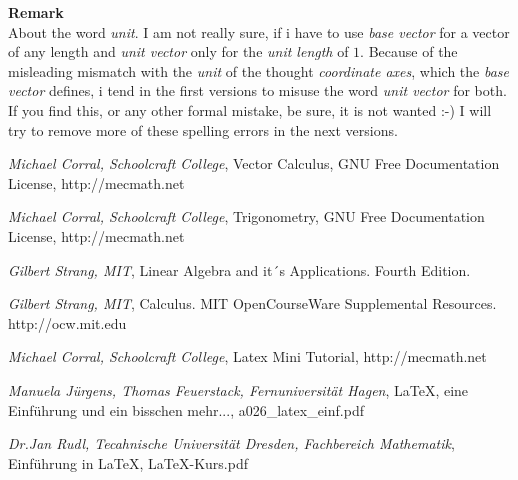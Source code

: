 \documentclass[a4paper]{article}
\begin{document}
\textbf{Remark}\\
About the word \emph{unit}. I am not really sure, if i have to use \emph{base vector} for a vector of any length and \emph{unit vector} only for the \emph{unit length} of $1$. Because of the misleading mismatch with the \emph{unit} of the thought \emph{coordinate axes}, which the \emph{base vector} defines, i tend in the first versions to misuse the word \emph{unit vector} for both. If you find this, or any other formal mistake, be sure, it is not wanted :-) I will try to remove more of these spelling errors in the next versions.

\begin{thebibliography}    

     \textit{Michael Corral, Schoolcraft College},
	    Vector Calculus, GNU Free Documentation License, http://mecmath.net 
	    
     \textit{Michael Corral, Schoolcraft College},
	    Trigonometry, GNU Free Documentation License, http://mecmath.net         
	    
     \textit{Gilbert Strang, MIT},
	    Linear Algebra and it´s Applications. Fourth Edition.
	    
     \textit{Gilbert Strang, MIT},
            Calculus. MIT OpenCourseWare Supplemental Resources. http://ocw.mit.edu    
            
     \textit{Michael Corral, Schoolcraft College},
            Latex Mini Tutorial, http://mecmath.net            
            
     \textit{Manuela J\"urgens, Thomas Feuerstack, Fernuniversit\"at Hagen},
            LaTeX, eine Einf\"uhrung und ein bisschen mehr..., a026\_latex\_einf.pdf
            
     \textit{Dr.Jan Rudl, Tecahnische Universit\"at Dresden, Fachbereich Mathematik},
            Einf\"uhrung in LaTeX, LaTeX-Kurs.pdf            

\end{thebibliography}
\printindex
\end{document}
